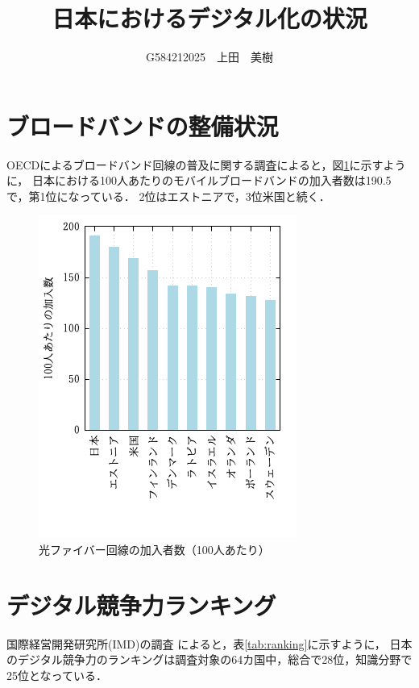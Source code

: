 \documentclass[a4paper,11pt,dvipdfmx]{ujarticle}
\title{日本におけるデジタル化の状況}
\author{G584212025　上田　美樹}
\begin{document}
\maketitle %

\section{ブロードバンドの整備状況}



OECDによるブロードバンド回線の普及に関する調査\cite{oecd}によると，図\ref{fig:imd}に示すように，
日本における100人あたりのモバイルブロードバンドの加入者数は190.5で，第1位になっている．
2位はエストニアで，3位米国と続く．

 
\begin{figure}[H]
  \centering
  \includegraphics[width=0.6
  \linewidth]{fig21.png}
  \caption{光ファイバー回線の加入者数（100人あたり）}
  \label{fig:imd}
\end{figure}


\section{デジタル競争力ランキング}

国際経営開発研究所(IMD)の調査 \cite{imd} によると，表\ref{tab:ranking}に示すように，
日本のデジタル競争力のランキングは調査対象の64カ国中，総合で28位，知識分野で25位となっている．
\end{document}
